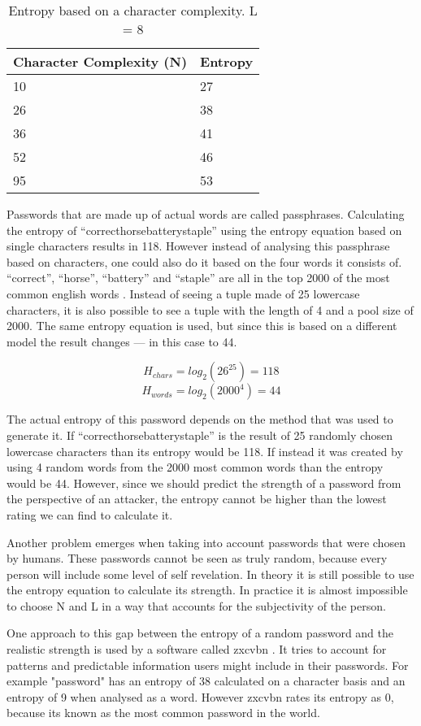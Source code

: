 \begin{table}[h!]
\centering
\begin{tabular}{l l}
    Character Complexity (N) & Entropy \\
    \hline
    10                       & 27 \\
    26                       & 38 \\
    36                       & 41 \\
    52                       & 46 \\
    95                       & 53
\end{tabular}
\caption{Entropy based on a character complexity. L = 8}
\end{table}

Passwords that are made up of actual words are called passphrases. Calculating the entropy of ``correcthorsebatterystaple'' using the entropy equation based on single characters results in 118. However instead of analysing this passphrase based on characters, one could also do it based on the four words it consists of. ``correct'', ``horse'', ``battery'' and ``staple'' are all in the top 2000 of the most common english words \cite{commonwords}. Instead of seeing a tuple made of 25 lowercase characters, it is also possible to see a tuple with the length of 4 and a pool size of 2000. The same entropy equation is used, but since this is based on a different model the result changes --- in this case to 44.

\begin{equation}
H_{chars} = log_2(26^{25}) = 118
\end{equation}
\begin{equation}
H_{words} = log_2(2000^4) = 44
\end{equation}

The actual entropy of this password depends on the method that was used to generate it. If ``correcthorsebatterystaple'' is the result of 25 randomly chosen lowercase characters than its entropy would be 118. If instead it was created by using 4 random words from the 2000 most common words than the entropy would be 44. However, since we should predict the strength of a password from the perspective of an attacker, the entropy cannot be higher than the lowest rating we can find to calculate it.

Another problem emerges when taking into account passwords that were chosen by humans. These passwords cannot be seen as truly random, because every person will include some level of self revelation. In theory it is still possible to use the entropy equation to calculate its strength. In practice it is almost impossible to choose N and L in a way that accounts for the subjectivity of the person.

One approach to this gap between the entropy of a random password and the realistic strength is used by a software called zxcvbn \cite{zxcvbn}. It tries to account for patterns and predictable information users might include in their passwords. For example "password" has an entropy of 38 calculated on a character basis and an entropy of 9 when analysed as a word. However zxcvbn rates its entropy as 0, because its known as the most common password in the world.

\newpage
